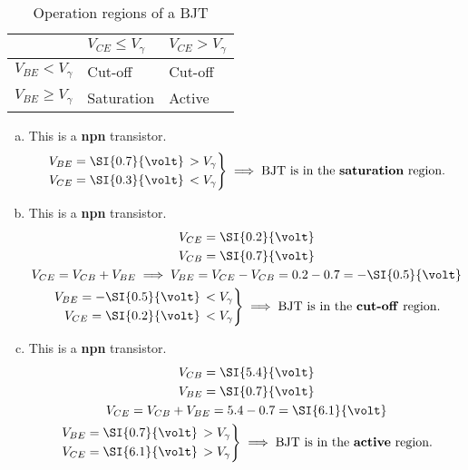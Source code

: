 \documentclass[10pt,a4paper]{memoir}
\begin{document}
\begin{solution}
  \begin{table}[!h]
  \centering
  \begin{tabular}{l | l l}
    \toprule
     & $V_{CE} \leq V_{\gamma}$ & $V_{CE} > V_{\gamma}$ \\
    \midrule
    $V_{BE} < V_{\gamma}$     & Cut-off     & Cut-off \\
    $V_{BE} \geq V_{\gamma}$  & Saturation  & Active \\
    \bottomrule
  \end{tabular}
  \caption{Operation regions of a BJT}
  \end{table}
  \begin{enumerate}[(a)]
    \item This is a \textbf{npn} transistor.
      \begin{equation*}
        \left.
        \begin{aligned}
          V_{BE} = \SI{0.7}{\volt} \, &> V_{\gamma} \\
          V_{CE} = \SI{0.3}{\volt} \, &< V_{\gamma}
        \end{aligned} \right\rbrace \implies \mbox{BJT is in the \textbf{saturation} region.}
      \end{equation*}
    \item This is a \textbf{npn} transistor.
      \begin{gather*}
        V_{CE} = \SI{0.2}{\volt} \\
        V_{CB} = \SI{0.7}{\volt} \\
        V_{CE} = V_{CB} + V_{BE} \implies V_{BE} = V_{CE} - V_{CB} = 0.2 - 0.7 =  -\SI{0.5}{\volt} \\
        \left.
        \begin{aligned}
          V_{BE} = -\SI{0.5}{\volt} \, &< V_{\gamma} \\
          V_{CE} =  \SI{0.2}{\volt} \, &< V_{\gamma}
        \end{aligned} \right\rbrace \implies \mbox{BJT is in the \textbf{cut-off} region.}
      \end{gather*}
    \item This is a \textbf{npn} transistor.
    \begin{gather*}
        V_{CB} = \SI{5.4}{\volt} \\
        V_{BE} = \SI{0.7}{\volt} \\
        V_{CE} = V_{CB} + V_{BE} = 5.4 - 0.7 =  \SI{6.1}{\volt} \\
        \left.
        \begin{aligned}
          V_{BE} = \SI{0.7}{\volt} \, &> V_{\gamma} \\
          V_{CE} = \SI{6.1}{\volt} \, &> V_{\gamma}
        \end{aligned} \right\rbrace \implies \mbox{BJT is in the \textbf{active} region.}
      \end{gather*}
  \end{enumerate}
\end{solution}
\end{document}
